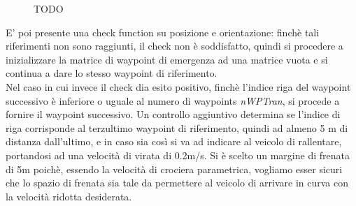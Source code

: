 \documentclass{article}
\begin{document}
            \begin{figure} [ht]
                \caption{TODO}
                \label{fig:aligned}
            \end{figure}

            E' poi presente una check function su posizione e orientazione: finchè tali riferimenti non sono raggiunti, il check non è soddisfatto, quindi si procedere a
            inizializzare la matrice di waypoint di emergenza ad una matrice vuota e si continua a dare lo stesso waypoint di riferimento.\\
            Nel caso in cui invece il check dia esito positivo, finchè l'indice riga del waypoint successivo è inferiore o uguale al numero di waypoints \emph{nWPTran}, 
            si procede a fornire il waypoint successivo. Un controllo aggiuntivo determina se l'indice di riga corrisponde al terzultimo
            waypoint di riferimento, quindi ad almeno 5 m di distanza dall'ultimo, e in caso sia così si va ad indicare al veicolo di 
            rallentare, portandosi ad una velocità di virata di 0.2m/s. Si è scelto un margine di frenata 
            di 5m poichè, essendo la velocità di crociera parametrica, vogliamo esser sicuri che lo spazio di frenata sia tale da permettere al veicolo di arrivare
            in curva con la velocità ridotta desiderata. \\ 
\end{document}
